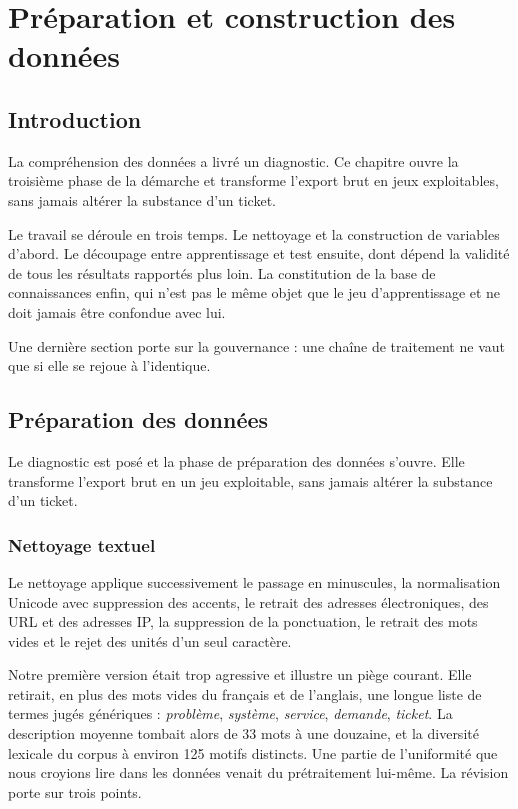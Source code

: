 \chapter{Préparation et construction des données}

\section*{Introduction}

La compréhension des données a livré un diagnostic. Ce chapitre ouvre la troisième phase de la
démarche et transforme l'export brut en jeux exploitables, sans jamais altérer la substance d'un
ticket.

Le travail se déroule en trois temps. Le nettoyage et la construction de variables d'abord. Le
découpage entre apprentissage et test ensuite, dont dépend la validité de tous les résultats
rapportés plus loin. La constitution de la base de connaissances enfin, qui n'est pas le même objet
que le jeu d'apprentissage et ne doit jamais être confondue avec lui.

Une dernière section porte sur la gouvernance : une chaîne de traitement ne vaut que si elle se
rejoue à l'identique.

\section{Préparation des données}

Le diagnostic est posé et la phase de préparation des données s'ouvre. Elle transforme l'export
brut en un jeu exploitable, sans jamais altérer la substance d'un ticket.

\subsection{Nettoyage textuel}
\label{sec:nettoyage}

Le nettoyage applique successivement le passage en minuscules, la normalisation Unicode avec
suppression des accents, le retrait des adresses électroniques, des URL et des adresses IP, la
suppression de la ponctuation, le retrait des mots vides et le rejet des unités d'un seul caractère.

Notre première version était trop agressive et illustre un piège courant. Elle retirait, en plus des
mots vides du français et de l'anglais, une longue liste de termes jugés génériques :
\emph{problème}, \emph{système}, \emph{service}, \emph{demande}, \emph{ticket}. La description
moyenne tombait alors de 33 mots à une douzaine, et la diversité lexicale du corpus à environ
125 motifs distincts. Une partie de l'uniformité que nous croyions lire dans les données venait du
prétraitement lui-même. La révision porte sur trois points.

